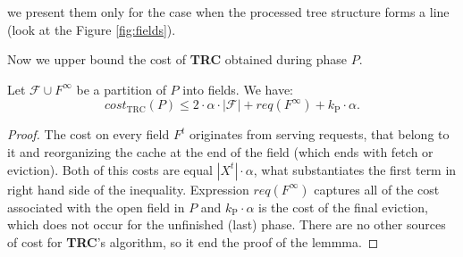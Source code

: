 we present them only for the case when the processed tree structure forms a line
(look at the Figure \ref{fig:fields}).

Now we upper bound the cost of \textbf{TRC} obtained during phase $P$.
\begin{lemma} Let $\mathcal{F} \cup F^{\infty}$ be a partition of $P$ into
fields. We have: $$cost_{\mathrm{TRC}}(P) \leq 2 \cdot \alpha \cdot
|\mathcal{F}| + req(F^{\infty}) + k_{\mathrm{P}} \cdot \alpha.$$ \label{thm:trc_cost}
\end{lemma} \begin{proof} The cost on every field $F^t$ originates from serving
requests, that belong to it and reorganizing the cache at the end of the field
(which ends with fetch or eviction). Both of this costs are equal $|X^t| \cdot
\alpha$, what substantiates the first term in right hand side of the inequality.
Expression $req(F^{\infty})$ captures all of the cost associated with the open
field in $P$ and $k_{\mathrm{P}} \cdot \alpha$ is the cost of the final eviction, which
does not occur for the unfinished (last) phase. There are no other sources of
cost for \textbf{TRC}'s algorithm, so it end the proof of the lemmma.
\end{proof}

